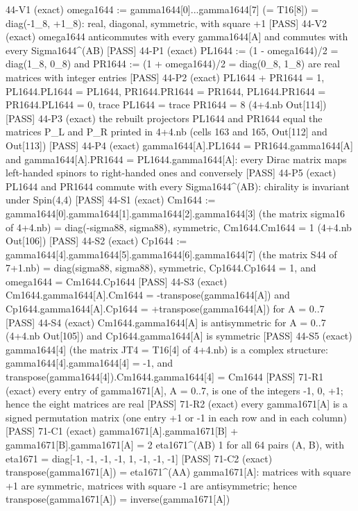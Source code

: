 \documentclass[
  10pt,
]{article}
\newenvironment{Shaded}{}{}
\newcommand{\NormalTok}[1]{#1}
\begin{document}
\begin{Shaded}
\begin{Highlighting}[]
\NormalTok{[PASS] 44{-}V1  (exact) omega1644 := gamma1644[0]...gamma1644[7] (= T16[8]) = diag({-}1\_8, +1\_8): real, diagonal, symmetric, with square +1}
\NormalTok{[PASS] 44{-}V2  (exact) omega1644 anticommutes with every gamma1644[A] and commutes with every Sigma1644\^{}(AB)}
\NormalTok{[PASS] 44{-}P1  (exact) PL1644 := (1 {-} omega1644)/2 = diag(1\_8, 0\_8) and PR1644 := (1 + omega1644)/2 = diag(0\_8, 1\_8) are real matrices with integer entries}
\NormalTok{[PASS] 44{-}P2  (exact) PL1644 + PR1644 = 1, PL1644.PL1644 = PL1644, PR1644.PR1644 = PR1644, PL1644.PR1644 = PR1644.PL1644 = 0, trace PL1644 = trace PR1644 = 8 (4+4.nb Out[114])}
\NormalTok{[PASS] 44{-}P3  (exact) the rebuilt projectors PL1644 and PR1644 equal the matrices P\_L and P\_R printed in 4+4.nb (cells 163 and 165, Out[112] and Out[113])}
\NormalTok{[PASS] 44{-}P4  (exact) gamma1644[A].PL1644 = PR1644.gamma1644[A] and gamma1644[A].PR1644 = PL1644.gamma1644[A]: every Dirac matrix maps left{-}handed spinors to right{-}handed ones and conversely}
\NormalTok{[PASS] 44{-}P5  (exact) PL1644 and PR1644 commute with every Sigma1644\^{}(AB): chirality is invariant under Spin(4,4)}
\NormalTok{[PASS] 44{-}S1  (exact) Cm1644 := gamma1644[0].gamma1644[1].gamma1644[2].gamma1644[3] (the matrix sigma16 of 4+4.nb) = diag({-}sigma88, sigma88), symmetric, Cm1644.Cm1644 = 1 (4+4.nb Out[106])}
\NormalTok{[PASS] 44{-}S2  (exact) Cp1644 := gamma1644[4].gamma1644[5].gamma1644[6].gamma1644[7] (the matrix S44 of 7+1.nb) = diag(sigma88, sigma88), symmetric, Cp1644.Cp1644 = 1, and omega1644 = Cm1644.Cp1644}
\NormalTok{[PASS] 44{-}S3  (exact) Cm1644.gamma1644[A].Cm1644 = {-}transpose(gamma1644[A]) and Cp1644.gamma1644[A].Cp1644 = +transpose(gamma1644[A]) for A = 0..7}
\NormalTok{[PASS] 44{-}S4  (exact) Cm1644.gamma1644[A] is antisymmetric for A = 0..7 (4+4.nb Out[105]) and Cp1644.gamma1644[A] is symmetric}
\NormalTok{[PASS] 44{-}S5  (exact) gamma1644[4] (the matrix JT4 = T16[4] of 4+4.nb) is a complex structure: gamma1644[4].gamma1644[4] = {-}1, and transpose(gamma1644[4]).Cm1644.gamma1644[4] = Cm1644}
\NormalTok{[PASS] 71{-}R1  (exact) every entry of gamma1671[A], A = 0..7, is one of the integers {-}1, 0, +1; hence the eight matrices are real}
\NormalTok{[PASS] 71{-}R2  (exact) every gamma1671[A] is a signed permutation matrix (one entry +1 or {-}1 in each row and in each column)}
\NormalTok{[PASS] 71{-}C1  (exact) gamma1671[A].gamma1671[B] + gamma1671[B].gamma1671[A] = 2 eta1671\^{}(AB) 1 for all 64 pairs (A, B), with eta1671 = diag[{-}1, {-}1, {-}1, {-}1, 1, {-}1, {-}1, {-}1]}
\NormalTok{[PASS] 71{-}C2  (exact) transpose(gamma1671[A]) = eta1671\^{}(AA) gamma1671[A]: matrices with square +1 are symmetric, matrices with square {-}1 are antisymmetric; hence transpose(gamma1671[A]) = inverse(gamma1671[A])}

\end{Highlighting}
\end{Shaded}
\end{document}
